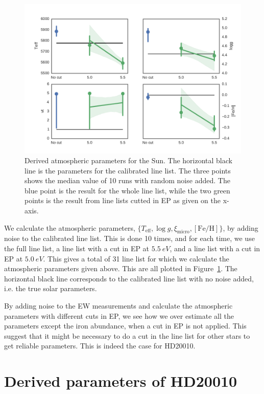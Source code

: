 \documentclass{aa}
\begin{document}
\begin{figure}[htpb]
    \centering
    \includegraphics[width=0.9\linewidth]{figures/solar_parameters_10runs.pdf}
    \caption{Derived atmospheric parameters for the Sun. The horizontal black
    line is the parameters for the calibrated line list. The three points shows
    the median value of 10 runs with random noise added. The blue point is the
    result for the whole line list, while the two green points is the result
    from line lists cutted in EP as given on the x-axis.}
    \label{fig:solar_parameters}
\end{figure}

We calculate the atmospheric parameters, $\{T_\mathrm{eff}, \log
g, \xi_\mathrm{micro}, [\mathrm{Fe/H}]\}$, by adding noise to the
calibrated line list. This is done 10 times, and for each time, we use
the full line list, a line list with a cut in EP at $\SI{5.5}{eV}$, and
a line list with a cut in EP at $\SI{5.0}{eV}$. This gives a total of
31 line list for which we calculate the atmospheric parameters given
above. This are all plotted in Figure~\ref{fig:solar_parameters}. The
horizontal black line corresponds to the calibrated line list with no
noise added, i.e. the true solar parameters.

By adding noise to the EW measurements and calculate the atmospheric
parameters with different cuts in EP, we see how we over estimate all
the parameters except the iron abundance, when a cut in EP is not
applied. This suggest that it might be necessary to do a cut in the line
list for other stars to get reliable parameters. This is indeed the case
for HD20010.



\section{Derived parameters of HD20010}
\label{sec:derived_parameters_of_hd20010}
\end{document}
